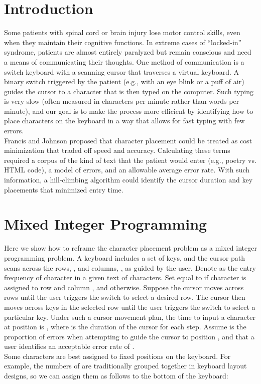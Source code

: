 \documentclass{sig-alternate}
\begin{document}


\section{Introduction}
Some patients with spinal cord or brain injury lose motor control skills, even when they maintain their cognitive functions. In extreme cases of ``locked-in'' syndrome, patients are almost entirely paralyzed but remain conscious and need a means of communicating their thoughts. One method of communication is a switch keyboard with a scanning cursor that traverses a virtual keyboard. A binary switch  triggered by the patient (e.g., with an eye blink or a puff of air) guides the cursor to a character that is then typed on the computer.  Such typing is very slow (often measured in characters per minute rather than words per minute), and our goal is to make the process more efficient by identifying how to place characters on the keyboard in a way that allows for fast typing with few errors.\\
Francis and Johnson \cite{Francis2011} proposed that character placement could be treated as cost minimization that traded off speed and accuracy. Calculating these terms required a corpus of the kind of text that the patient would enter (e.g., poetry vs. HTML code), a model of errors, and an allowable average error rate. With such information, a hill-climbing algorithm could identify the cursor duration and key placements that minimized entry time.\\ 
\section{Mixed Integer Programming}
Here we show how to reframe the character placement problem as a mixed integer programming problem. A keyboard includes a set  of keys, and the cursor path scans across the rows, , and columns, , as guided by the user. Denote  as the entry frequency of character  in a given text of characters.  Set  equal to  if character  is assigned to row  and column , and  otherwise. Suppose the cursor moves across rows until the user triggers the switch to select a desired row. The cursor then moves across keys in the selected row until the user triggers the switch to select a particular key. Under such a cursor movement plan, the time to input a  character  at position  is , where  is the duration of the cursor for each step. Assume  is the proportion of errors when attempting to guide the cursor to position , and that a user identifies an acceptable error rate of .\\
Some characters are best assigned to fixed positions on the keyboard. For example,  the numbers of  are traditionally grouped together in keyboard layout designs, so we can assign them as follows to the bottom of the keyboard: 
 
\end{document}
